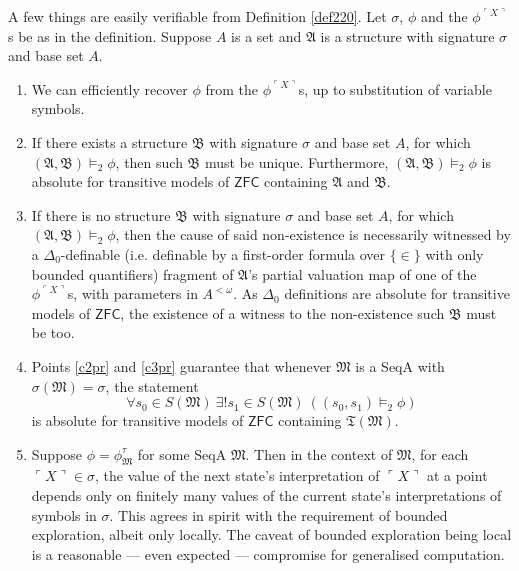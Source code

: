 \documentclass[12pt]{article}
\numberwithin{equation}{section}
\begin{document}
A few things are easily verifiable from Definition \ref{def220}. Let $\sigma$, $\phi$ and the $\phi^{\ulcorner X \urcorner}$s be as in the definition. Suppose $A$ is a set and $\mathfrak{A}$ is a structure with signature $\sigma$ and base set $A$.
\begin{enumerate}[label=(C\arabic*)]
    \item We can efficiently recover $\phi$ from the $\phi^{\ulcorner X \urcorner}$s, up to substitution of variable symbols.
    \item\label{c2pr} If there exists a structure $\mathfrak{B}$ with signature $\sigma$ and base set $A$, for which $(\mathfrak{A}, \mathfrak{B}) \models_2 \phi$, then such $\mathfrak{B}$ must be unique. Furthermore, $(\mathfrak{A}, \mathfrak{B}) \models_2 \phi$ is absolute for transitive models of $\mathsf{ZFC}$ containing $\mathfrak{A}$ and $\mathfrak{B}$.
    \item\label{c3pr} If there is no structure $\mathfrak{B}$ with signature $\sigma$ and base set $A$, for which $(\mathfrak{A}, \mathfrak{B}) \models_2 \phi$, then the cause of said non-existence is necessarily witnessed by a $\Delta_0$-definable (i.e. definable by a first-order formula over $\{\in\}$ with only bounded quantifiers) fragment of $\mathfrak{A}$'s partial valuation map of one of the $\phi^{\ulcorner X \urcorner}$s, with parameters in $A^{< \omega}$. As $\Delta_0$ definitions are absolute for transitive models of $\mathsf{ZFC}$, the existence of a witness to the non-existence such $\mathfrak{B}$ must be too.
    \item\label{c4pr} Points \ref{c2pr} and \ref{c3pr} guarantee that whenever $\mathfrak{M}$ is a SeqA with $\sigma(\mathfrak{M}) = \sigma$, the statement
    \begin{equation*}
        \forall s_0 \in S(\mathfrak{M}) \ \exists ! s_1 \in S(\mathfrak{M}) \ ((s_0, s_1) \models_2 \phi)
    \end{equation*}
    is absolute for transitive models of $\mathsf{ZFC}$ containing $\mathfrak{T}(\mathfrak{M})$.
    \item Suppose $\phi = \phi^{\tau}_{\mathfrak{M}}$ for some SeqA $\mathfrak{M}$. Then in the context of $\mathfrak{M}$, for each $\ulcorner X \urcorner \in \sigma$, the value of the next state's interpretation of $\ulcorner X \urcorner$ at a point depends only on finitely many values of the current state's interpretations of symbols in $\sigma$. This agrees in spirit with the requirement of bounded exploration, albeit only locally. The caveat of bounded exploration being local is a reasonable --- even expected --- compromise for generalised computation.
\end{enumerate}
\end{document}

